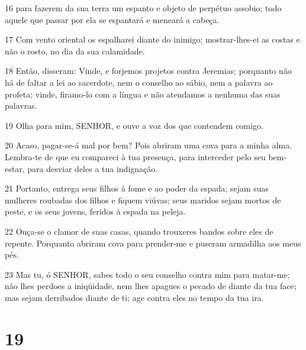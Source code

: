 \par 16 para fazerem da sua terra um espanto e objeto de perpétuo assobio; todo aquele que passar por ela se espantará e meneará a cabeça.
\par 17 Com vento oriental os espalharei diante do inimigo; mostrar-lhes-ei as costas e não o rosto, no dia da sua calamidade.
\par 18 Então, disseram: Vinde, e forjemos projetos contra Jeremias; porquanto não há de faltar a lei ao sacerdote, nem o conselho ao sábio, nem a palavra ao profeta; vinde, firamo-lo com a língua e não atendamos a nenhuma das suas palavras.
\par 19 Olha para mim, SENHOR, e ouve a voz dos que contendem comigo.
\par 20 Acaso, pagar-se-á mal por bem? Pois abriram uma cova para a minha alma. Lembra-te de que eu compareci à tua presença, para interceder pelo seu bem-estar, para desviar deles a tua indignação.
\par 21 Portanto, entrega seus filhos à fome e ao poder da espada; sejam suas mulheres roubadas dos filhos e fiquem viúvas; seus maridos sejam mortos de peste, e os seus jovens, feridos à espada na peleja.
\par 22 Ouça-se o clamor de suas casas, quando trouxeres bandos sobre eles de repente. Porquanto abriram cova para prender-me e puseram armadilha aos meus pés.
\par 23 Mas tu, ó SENHOR, sabes todo o seu conselho contra mim para matar-me; não lhes perdoes a iniqüidade, nem lhes apagues o pecado de diante da tua face; mas sejam derribados diante de ti; age contra eles no tempo da tua ira.

\chapter{19}


